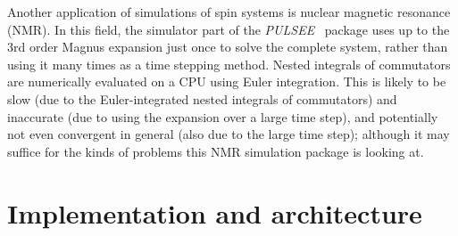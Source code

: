 \documentclass{jors}
\begin{document}

		Another application of simulations of spin systems is nuclear magnetic resonance (NMR).
		In this field, the simulator part of the \emph{PULSEE}~\cite{candoli_pulsee_2021} package uses up to the 3rd order Magnus expansion just once to solve the complete system, rather than using it many times as a time stepping method.
		Nested integrals of commutators are numerically evaluated on a CPU using Euler integration.
		This is likely to be slow (due to the Euler-integrated nested integrals of commutators) and inaccurate (due to using the expansion over a large time step), and potentially not even convergent in general (also due to the large time step); although it may suffice for the kinds of problems this NMR simulation package is looking at.



\section{Implementation and architecture}
\end{document}
